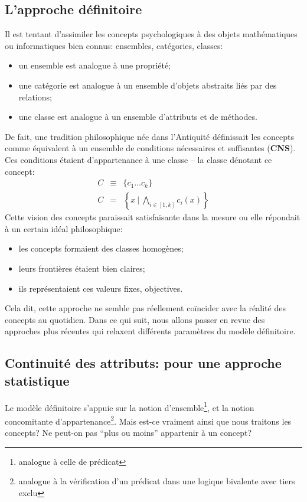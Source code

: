 \documentclass[french]{article}
\begin{document}
		\subsection{L'approche définitoire}
			Il est tentant d'assimiler les concepts psychologiques à des objets mathématiques ou informatiques bien connus: ensembles, catégories, classes:
			\begin{itemize}
				\item un ensemble est analogue à une propriété;
				\item une catégorie est analogue à un ensemble d'objets abstraits liés par des relations;
				\item une classe est analogue à un ensemble d'attributs et de méthodes. 
			\end{itemize}
			De fait, une tradition philosophique née dans l'Antiquité définissait les concepts comme équivalent à un ensemble de conditions nécessaires et suffisantes (\textbf{CNS}). Ces conditions étaient d'appartenance à une classe -- la classe dénotant ce concept:
			\begin{eqnarray*}
			C &\equiv&  \lbrace c_1 \dots c_k \rbrace \\
			C &=& \left\lbrace x \ |\ \bigwedge_{i \in [1, k]}c_i(x)\right\rbrace
			\end{eqnarray*}
			Cette vision des concepts paraissait satisfaisante dans la mesure ou elle répondait à un certain idéal philosophique:
			\begin{itemize}
				\item les concepts formaient des classes homogènes;
				\item leurs frontières étaient bien claires;
				\item ils représentaient ces valeurs fixes, objectives.
			\end{itemize}
			Cela dit, cette approche ne semble pas réellement coïncider avec la réalité des concepts au quotidien. Dans ce qui suit, nous allons passer en revue des approches plus récentes qui relaxent différents paramètres du modèle définitoire.
			\subsection{Continuité des attributs: pour une approche statistique}\label{concept_stat}
				Le modèle définitoire s'appuie sur la notion d'ensemble\footnote{analogue à celle de prédicat}, et la notion concomitante d'appartenance\footnote{analogue à la vérification d'un prédicat dans une logique bivalente avec tiers exclu}. Mais est-ce vraiment ainsi que nous traitons les concepts? Ne peut-on pas ``plus ou moins'' appartenir à un concept?
\end{document}
